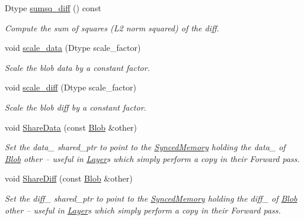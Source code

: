 \begin{DoxyCompactItemize}
\mbox{\label{classcaffe_1_1_blob_a2df1894f11323235f9d7c7a1f0fe010f}} 
Dtype \mbox{\hyperlink{classcaffe_1_1_blob_a2df1894f11323235f9d7c7a1f0fe010f}{sumsq\+\_\+diff}} () const
\begin{DoxyCompactList}\small\item\em Compute the sum of squares (L2 norm squared) of the diff. \end{DoxyCompactList}\item 
\mbox{\label{classcaffe_1_1_blob_a535dd556e777f2e13b8c7438f40749a0}} 
void \mbox{\hyperlink{classcaffe_1_1_blob_a535dd556e777f2e13b8c7438f40749a0}{scale\+\_\+data}} (Dtype scale\+\_\+factor)
\begin{DoxyCompactList}\small\item\em Scale the blob data by a constant factor. \end{DoxyCompactList}\item 
\mbox{\label{classcaffe_1_1_blob_a6d2d83920d961fff033434347f64a3b0}} 
void \mbox{\hyperlink{classcaffe_1_1_blob_a6d2d83920d961fff033434347f64a3b0}{scale\+\_\+diff}} (Dtype scale\+\_\+factor)
\begin{DoxyCompactList}\small\item\em Scale the blob diff by a constant factor. \end{DoxyCompactList}\item 
void \mbox{\hyperlink{classcaffe_1_1_blob_a8fce5a816a2b9629686db69108610d93}{Share\+Data}} (const \mbox{\hyperlink{classcaffe_1_1_blob}{Blob}} \&other)
\begin{DoxyCompactList}\small\item\em Set the data\+\_\+ shared\+\_\+ptr to point to the \mbox{\hyperlink{classcaffe_1_1_synced_memory}{Synced\+Memory}} holding the data\+\_\+ of \mbox{\hyperlink{classcaffe_1_1_blob}{Blob}} other -- useful in \mbox{\hyperlink{classcaffe_1_1_layer}{Layer}}s which simply perform a copy in their Forward pass. \end{DoxyCompactList}\item 
void \mbox{\hyperlink{classcaffe_1_1_blob_a004781965b09f94c409cec9a6fc7c35c}{Share\+Diff}} (const \mbox{\hyperlink{classcaffe_1_1_blob}{Blob}} \&other)
\begin{DoxyCompactList}\small\item\em Set the diff\+\_\+ shared\+\_\+ptr to point to the \mbox{\hyperlink{classcaffe_1_1_synced_memory}{Synced\+Memory}} holding the diff\+\_\+ of \mbox{\hyperlink{classcaffe_1_1_blob}{Blob}} other -- useful in \mbox{\hyperlink{classcaffe_1_1_layer}{Layer}}s which simply perform a copy in their Forward pass. \end{DoxyCompactList}\item 

\end{DoxyCompactItemize}
